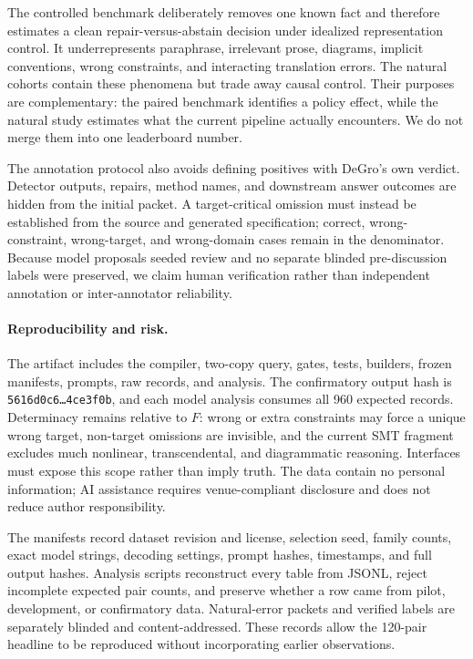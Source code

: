 \documentclass[sigconf,anonymous]{aamas}
\begin{document}
The controlled benchmark deliberately removes one known fact and therefore estimates a clean repair-versus-abstain decision under idealized representation control.  It underrepresents paraphrase, irrelevant prose, diagrams, implicit conventions, wrong constraints, and interacting translation errors.  The natural cohorts contain these phenomena but trade away causal control.  Their purposes are complementary: the paired benchmark identifies a policy effect, while the natural study estimates what the current pipeline actually encounters.  We do not merge them into one leaderboard number.

The annotation protocol also avoids defining positives with DeGro's own verdict.  Detector outputs, repairs, method names, and downstream answer outcomes are hidden from the initial packet.  A target-critical omission must instead be established from the source and generated specification; correct, wrong-constraint, wrong-target, and wrong-domain cases remain in the denominator.  Because model proposals seeded review and no separate blinded pre-discussion labels were preserved, we claim human verification rather than independent annotation or inter-annotator reliability.

\paragraph{Reproducibility and risk.}
The artifact includes the compiler, two-copy query, gates, tests, builders, frozen manifests, prompts, raw records, and analysis.  The confirmatory output hash is \texttt{5616d0c6\ldots4ce3f0b}, and each model analysis consumes all 960 expected records.  Determinacy remains relative to $F$: wrong or extra constraints may force a unique wrong target, non-target omissions are invisible, and the current SMT fragment excludes much nonlinear, transcendental, and diagrammatic reasoning.  Interfaces must expose this scope rather than imply truth.  The data contain no personal information; AI assistance requires venue-compliant disclosure and does not reduce author responsibility.

The manifests record dataset revision and license, selection seed, family counts, exact model strings, decoding settings, prompt hashes, timestamps, and full output hashes.  Analysis scripts reconstruct every table from JSONL, reject incomplete expected pair counts, and preserve whether a row came from pilot, development, or confirmatory data.  Natural-error packets and verified labels are separately blinded and content-addressed.  These records allow the 120-pair headline to be reproduced without incorporating earlier observations.
\end{document}
